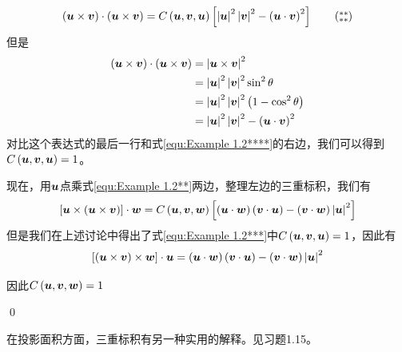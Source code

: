 \begin{solution}
\begin{equation}
         \left( \bb{u}\times \bb{v} \right) \cdot \left( \bb{u}\times \bb{v} \right) =C\left( \bb{u},\bb{v},\bb{u} \right) \left[ \left| \bb{u} \right|^2\left| \bb{v} \right|^2-\left( \bb{u}\cdot \bb{v} \right) ^2 \right] \tag{$\begin{subarray}{c}
            **\\
            **
        \end{subarray}$}
    \end{equation}
    但是
    \begin{align*}
        \left( \boldsymbol{u}\times \boldsymbol{v} \right) \cdot \left( \boldsymbol{u}\times \boldsymbol{v} \right) &=\left| \boldsymbol{u}\times \boldsymbol{v} \right|^2\\
        &=\left| \boldsymbol{u} \right|^2\left| \boldsymbol{v} \right|^2\sin ^2\theta\\
        &=\left| \boldsymbol{u} \right|^2\left| \boldsymbol{v} \right|^2\left( 1-\cos ^2\theta \right)\\
        &=\left| \boldsymbol{u} \right|^2\left| \boldsymbol{v} \right|^2-\left( \boldsymbol{u}\cdot \boldsymbol{v} \right) ^2
    \end{align*}
    对比这个表达式的最后一行和式\eqref{equ:Example 1.2****}的右边，我们可以得到${ C\left( \boldsymbol{u},\boldsymbol{v},\boldsymbol{u} \right) =1}$。

    现在，用$\boldsymbol{u}$点乘式\eqref{equ:Example 1.2**}两边，整理左边的三重标积，我们有
    \begin{equation*}
        \left[ \boldsymbol{u}\times \left( \boldsymbol{u}\times \boldsymbol{v} \right) \right] \cdot \boldsymbol{w}=C\left( \boldsymbol{u},\boldsymbol{v},\boldsymbol{w} \right) \left[ \left( \boldsymbol{u}\cdot \boldsymbol{w} \right) \left( \boldsymbol{v}\cdot \boldsymbol{u} \right) -\left( \boldsymbol{v}\cdot \boldsymbol{w} \right) \left| \boldsymbol{u} \right|^2 \right] 
    \end{equation*}
    但是我们在上述讨论中得出了式\eqref{equ:Example 1.2***}中${ C\left( \boldsymbol{u},\boldsymbol{v},\boldsymbol{u} \right) =1}$，因此有
    \begin{equation*}
        \left[ \left( \boldsymbol{u}\times \boldsymbol{v} \right) \times \boldsymbol{w} \right] \cdot \boldsymbol{u}=\left( \boldsymbol{u}\cdot \boldsymbol{w} \right) \left( \boldsymbol{v}\cdot \boldsymbol{u} \right) -\left( \boldsymbol{v}\cdot \boldsymbol{w} \right) \left| \boldsymbol{u} \right|^2
    \end{equation*}

    因此${ C\left( \boldsymbol{u},\boldsymbol{v},\boldsymbol{w} \right) =1}$

    \qed
\end{solution}
在投影面积方面，三重标积有另一种实用的解释。见习题1.15。

